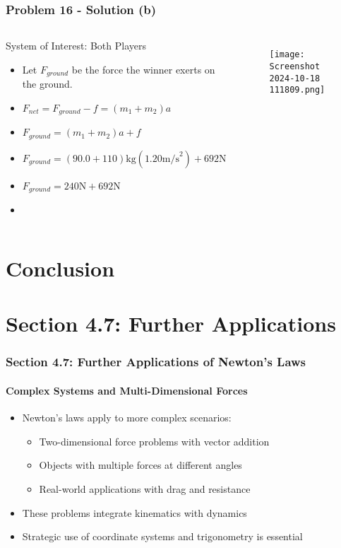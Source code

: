 \documentclass{beamer}
\begin{document}
\begin{frame}
\frametitle{Problem 16 - Solution (b)}
\begin{columns}[T]
        \begin{block}{System of Interest: Both Players}
            \begin{itemize}
                \item Let $F_{ground}$ be the force the winner exerts on the ground.
                \item $F_{net} = F_{ground} - f = (m_1+m_2)a$
                \item $F_{ground} = (m_1+m_2)a + f$
                \item $F_{ground} = (90.0+110)\text{kg}(1.20 \text{m/s}^2) + 692 \text{N}$
                \item $F_{ground} = 240 \text{N} + 692 \text{N}$
                \item {}
            \end{itemize}
        \end{block}
        \begin{figure}
            \centering
            \texttt{[image: Screenshot 2024-10-18 111809.png]}
        \end{figure}
\end{columns}
\end{frame}

\section{Conclusion}

\section{Section 4.7: Further Applications}

\begin{frame}
\frametitle{Section 4.7: Further Applications of Newton's Laws}
\framesubtitle{Complex Systems and Multi-Dimensional Forces}
\begin{itemize}
    \item Newton's laws apply to more complex scenarios: \pause
    \begin{itemize}
        \item Two-dimensional force problems with vector addition
        \item Objects with multiple forces at different angles
        \item Real-world applications with drag and resistance
    \end{itemize} \pause
    \item These problems integrate kinematics with dynamics \pause
    \item Strategic use of coordinate systems and trigonometry is essential
\end{itemize}
\end{frame}
\end{document}
